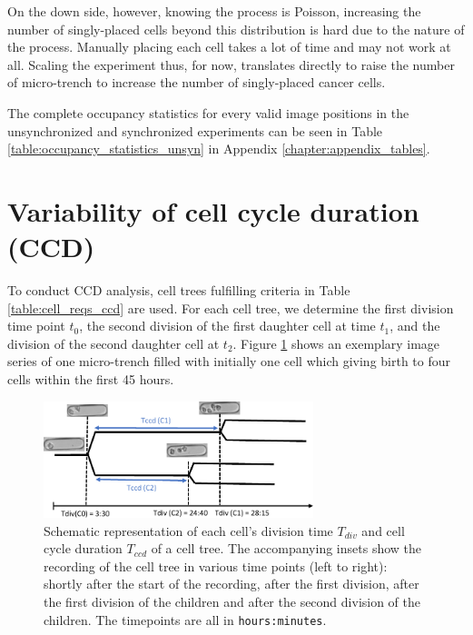 \documentclass[pdftex,12pt,a4paper]{report}
\begin{document}
On the down side, however, knowing the process is Poisson, increasing the number of singly-placed cells beyond this distribution is hard due to the nature of the process. Manually placing each cell takes a lot of time and may not work at all. Scaling the experiment thus, for now, translates directly to raise the number of micro-trench to increase the number of singly-placed cancer cells.

The complete occupancy statistics for every valid image positions in the unsynchronized and synchronized experiments can be seen in Table \ref{table:occupancy_statistics_unsyn} in Appendix \ref{chapter:appendix_tables}.

\section{Variability of cell cycle duration (CCD)}
\label{section:cell_cycle_duration}

To conduct CCD analysis, cell trees fulfilling criteria in Table \ref{table:cell_reqs_ccd} are used. For each cell tree, we determine the first division time point $t_0$, the second division of the first daughter cell at time $t_1$, and the division of the second daughter cell at $t_2$. Figure \ref{fig:ccd_schema} shows an exemplary image series of one micro-trench filled with initially one cell which giving birth to four cells within the first 45 hours. 

\begin{figure}[H]
\centering
\includegraphics[width=0.7\textwidth]{images/divs/cell_graphics.pdf}
\caption[Visualization of the tracking of a cell tree]{Schematic representation of each cell's division time $T_{div}$ and cell cycle duration $T_{ccd}$ of a cell tree. The accompanying insets show the recording of the cell tree in various time points (left to right): shortly after the start of the recording, after the first division, after the first division of the children and after the second division of the children. The timepoints are all in \texttt{hours:minutes}.}
\label{fig:ccd_schema}
\end{figure}
\end{document}
